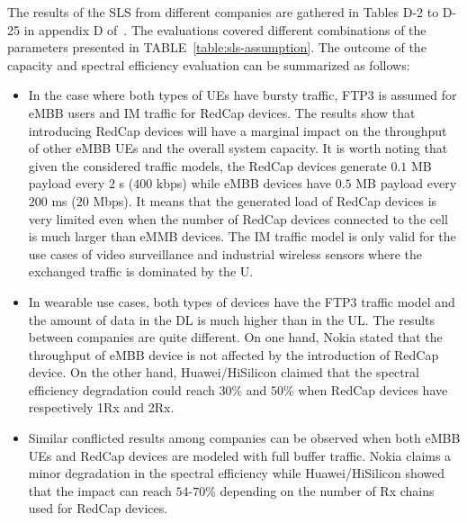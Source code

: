 \documentclass[]{IEEEtran}
\begin{document}
The results of the SLS from different companies are gathered in Tables D-2 to D-25 in appendix  D of~\cite{3gpp_study_2021_38.875}. 
The evaluations covered different combinations of the parameters presented in TABLE~\ref{table:sls-assumption}. 
The outcome of the capacity and spectral efficiency evaluation can be summarized as follows:

\begin{itemize}
    \item In the case where both types of UEs have bursty traffic, FTP3 is assumed for eMBB users and IM traffic for RedCap devices.
    The results show that introducing RedCap devices will have a marginal impact on the throughput of other eMBB UEs and the overall system capacity.
    It is worth noting that given the considered traffic models, the RedCap devices generate $0.1$ MB payload every $2$ s ($400$ kbps) while eMBB devices have $0.5$ MB payload every $200$ ms ($20$ Mbps). 
    It means that the generated load of RedCap devices is very limited even when the number of RedCap devices connected to the cell is much larger than eMMB devices. 
    The IM traffic model is only valid for the use cases of video surveillance and industrial wireless sensors where the exchanged traffic is dominated by the U.
    \item In wearable use cases, both types of devices have the FTP3 traffic model and the amount of data in the DL is much higher than in the UL.
    The results between companies are quite different.
    On one hand, Nokia stated that the throughput of eMBB device is not affected by the introduction of RedCap device. On the other hand, Huawei/HiSilicon claimed that the spectral efficiency degradation could reach $30$\% and $50$\% when RedCap devices have respectively 1Rx and 2Rx. 
    \item Similar conflicted results among companies can be observed when both eMBB UEs and RedCap devices are modeled with full buffer traffic. Nokia claims a minor degradation in the spectral efficiency while Huawei/HiSilicon showed that the impact can reach $5$4-$70$\% depending on the number of Rx chains used for RedCap devices.
\end{itemize}


\end{document}
